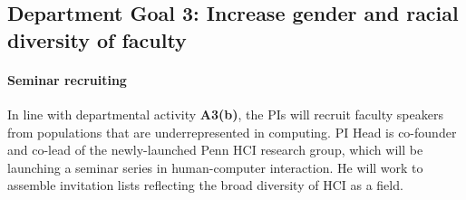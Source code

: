 \subsection*{Department Goal 3: Increase gender and racial diversity of faculty}

\paragraph*{Seminar recruiting}

In line with departmental activity \textbf{A3(b)}, the PIs will recruit faculty
speakers from populations that are underrepresented in computing. PI Head is
co-founder and co-lead of the newly-launched Penn HCI research group, which will
be launching a seminar series in human-computer interaction. He will work to
assemble invitation lists reflecting the broad diversity of HCI as a
field.







